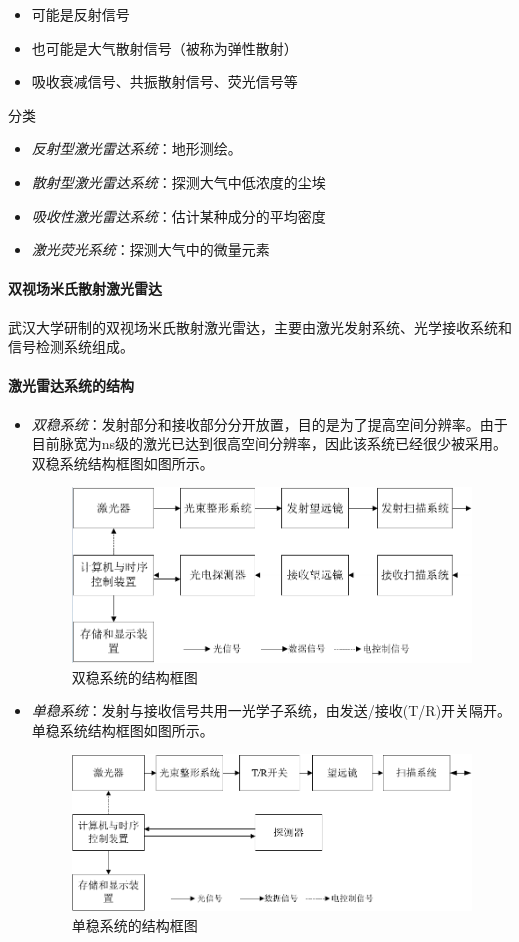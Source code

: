 \begin{enumerate}
{{\begin{itemize}
			\item 可能是反射信号
			\item 也可能是大气散射信号（被称为弹性散射）
			\item 吸收衰减信号、共振散射信号、荧光信号等
	\end{itemize}}分类}
		\begin{itemize}
			\item \textit{反射型激光雷达系统}：地形测绘。
			\item \textit{散射型激光雷达系统}：探测大气中低浓度的尘埃
			\item \textit{吸收性激光雷达系统}：估计某种成分的平均密度
			\item \textit{激光荧光系统}：探测大气中的微量元素
		\end{itemize}
\end{enumerate} %

\paragraph{双视场米氏散射激光雷达}武汉大学研制的双视场米氏散射激光雷达，主要由激光发射系统、光学接收系统和信号检测系统组成。

\paragraph{激光雷达系统的结构} 
\begin{itemize}
	\item \textit{双稳系统}：发射部分和接收部分分开放置，目的是为了提高空间分辨率。由于目前脉宽为ns级的激光已达到很高空间分辨率，因此该系统已经很少被采用。双稳系统结构框图如图所示。
		\begin{figure}[htbp]
			\centering
			\includegraphics[width=0.7\linewidth]{figure/Chapter2/双稳系统的结构框图}
			\caption{双稳系统的结构框图}
			\label{fig:双稳系统的结构框图}
		\end{figure}
	\item \textit{单稳系统}：发射与接收信号共用一光学子系统，由发送/接收(T/R)开关隔开。单稳系统结构框图如图所示。
		\begin{figure}[htbp]
			\centering
			\includegraphics[width=0.7\linewidth]{figure/Chapter2/单稳系统的结构框图}
			\caption{单稳系统的结构框图}
			\label{fig:单稳系统的结构框图}
		\end{figure}
\end{itemize}

